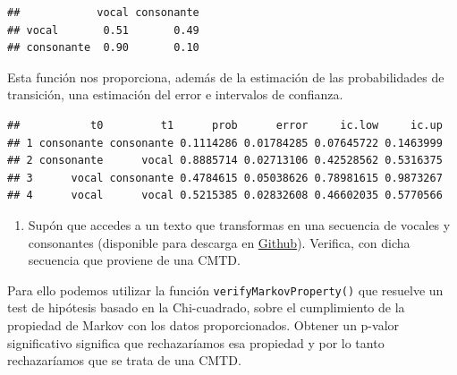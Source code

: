 \documentclass[
]{book}
\newenvironment{Shaded}{\begin{snugshade}}{\end{snugshade}}
\newcommand{\FunctionTok}[1]{\textcolor[rgb]{0.00,0.00,0.00}{#1}}
\newcommand{\NormalTok}[1]{#1}
\newcommand{\OtherTok}[1]{\textcolor[rgb]{0.56,0.35,0.01}{#1}}
\newcommand{\SpecialCharTok}[1]{\textcolor[rgb]{0.00,0.00,0.00}{#1}}
\newcommand{\StringTok}[1]{\textcolor[rgb]{0.31,0.60,0.02}{#1}}
\providecommand{\tightlist}{%
  \setlength{\itemsep}{0pt}\setlength{\parskip}{0pt}}
\theoremstyle{definition}
\theoremstyle{definition}
\theoremstyle{definition}
\theoremstyle{definition}
\theoremstyle{remark}
\begin{document}
\begin{verbatim}
##            vocal consonante
## vocal       0.51       0.49
## consonante  0.90       0.10
\end{verbatim}

Esta función nos proporciona, además de la estimación de las probabilidades de transición, una estimación del error e intervalos de confianza.

\begin{Shaded}
\end{Shaded}

\begin{verbatim}
##           t0         t1      prob      error     ic.low     ic.up
## 1 consonante consonante 0.1114286 0.01784285 0.07645722 0.1463999
## 2 consonante      vocal 0.8885714 0.02713106 0.42528562 0.5316375
## 3      vocal consonante 0.4784615 0.05038626 0.78981615 0.9873267
## 4      vocal      vocal 0.5215385 0.02832608 0.46602035 0.5770566
\end{verbatim}

\begin{enumerate}
\def\labelenumi{\arabic{enumi}.}
\setcounter{enumi}{8}
\tightlist
\item
  Supón que accedes a un texto que transformas en una secuencia de vocales y consonantes (disponible para descarga en \href{\%22https://raw.githubusercontent.com/UMH1477/data/f4e4a62533e24a74be27b8984f9fc23eb1b1ff49/textos.csv\%22}{Github}). Verifica, con dicha secuencia que proviene de una CMTD.
\end{enumerate}

Para ello podemos utilizar la función \texttt{verifyMarkovProperty()} que resuelve un test de hipótesis basado en la Chi-cuadrado, sobre el cumplimiento de la propiedad de Markov con los datos proporcionados. Obtener un p-valor significativo significa que rechazaríamos esa propiedad y por lo tanto rechazaríamos que se trata de una CMTD.
\end{document}
